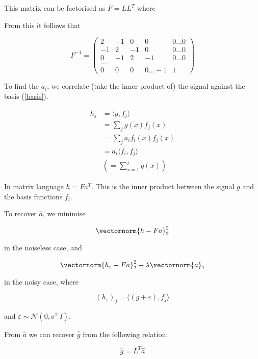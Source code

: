 This matrix can be factorised as \(F = LL^T\) where 


From this it follows that

\begin{equation}
F^{-1} = \begin{pmatrix}
 2 & -1 & 0 & 0  & 0 \ldots 0 \\
  -1 & 2 & -1 & 0  & 0 \ldots 0\\
     0 & -1 & 2 & -1  & 0 \ldots0  \\
    \ldots  \\
     0 & 0 & 0 & 0  \ldots -1 & 1 
\end{pmatrix}
\end{equation}

To find the \(a_i\), we correlate (take the inner product of) the signal against the basis (\ref{basis}).

\begin{definition}
\begin{align}
h_j &= \langle g, f_j \rangle \\
&= \sum_j g\left(x\right) f_j\left(x\right) \\
&= \sum_j a_i f_i\left(x\right) f_j\left(x\right) \\
&= a_i \langle f_i, f_j\rangle \\
&\left(= \sum_{x=1}^j g\left(x\right)\right)
\end{align}

In matrix language \(h = F a^T\). This is the inner product between the signal \(g\) and the basis functions \(f_i\).
\end{definition}

To recover \(\hat{a}\), we minimise

\begin{equation}
\vectornorm{h - Fa}_2^2
\end{equation}

in the noiseless case, and

\begin{equation}
\vectornorm{h_\varepsilon - Fa}_2^2 + \lambda\vectornorm{a}_1
\label{recon}
\end{equation}

in the noisy case, where 

\begin{equation}
\left(h_\varepsilon\right)_j = \langle\left(g+\varepsilon\right), f_j\rangle
\end{equation}

and \(\varepsilon \sim \mathcal{N}(0,\sigma^2\ I)\).

From \(\hat{a}\) we can recover \(\hat{g}\) from the following relation:

\begin{equation}
\hat{g} = L^{T} \hat{a}
\end{equation}